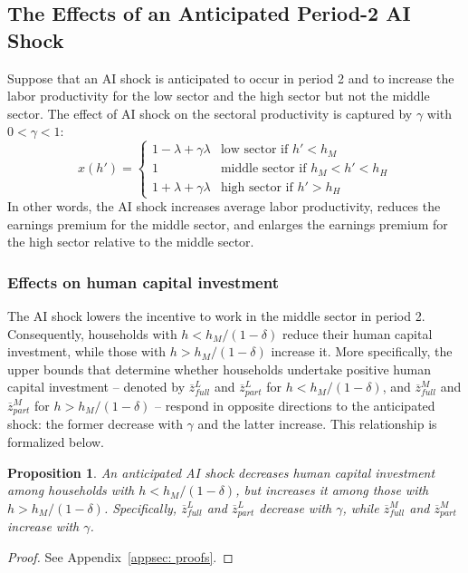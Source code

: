 \documentclass[12pt]{article}
\newtheorem{proposition}{Proposition}
\begin{document}
\subsection{The Effects of an Anticipated Period-2 AI Shock}
Suppose that an AI shock is anticipated to occur in period 2 and to increase the labor productivity for the low sector and the high sector but not the middle sector. The effect of AI shock on the sectoral productivity is captured by $\gamma$ with $0<\gamma<1$:
\begin{equation}
    \label{eq:xAI}
x(h')=\left \{ 
\begin{array}{cl}
1-\lambda + \gamma \lambda & \text{low sector if }h'<h_{M} \\ 
1 & \text{middle sector if }h_{M}<h'<h_{H} \\ 
1+\lambda + \gamma \lambda & \text{high sector if }h'>h_{H}%
\end{array}%
\right. 
\end{equation}
In other words, the AI shock increases average labor productivity, reduces the earnings premium for the middle sector, and enlarges the earnings premium for the high sector relative to the middle sector.


\subsubsection{Effects on human capital investment} 

The AI shock lowers the incentive to work in the middle sector in period 2. Consequently, households with $h < h_M/(1-\delta)$ reduce their human capital investment, while those with $h > h_M/(1-\delta)$ increase it. More specifically, the upper bounds that determine whether households undertake positive human capital investment -- denoted by $\overline{z}^L_{full}$ and $\overline{z}^L_{part}$ for $h < h_M/(1-\delta)$, and $\overline{z}^M_{full}$ and $\overline{z}^M_{part}$ for $h > h_M/(1-\delta)$ -- respond in opposite directions to the anticipated shock: the former decrease with $\gamma$ and the latter increase. This relationship is formalized below.

\begin{proposition}\label{prop:AI_human_capital}
An anticipated AI shock decreases human capital investment among households with $h < h_M/(1-\delta)$, but increases it among those with $h > h_M/(1-\delta)$. Specifically, $\overline{z}^L_{full}$ and $\overline{z}^L_{part}$ decrease with $\gamma$, while $\overline{z}^M_{full}$ and $\overline{z}^M_{part}$ increase with $\gamma$.
\end{proposition}
\begin{proof}
    See Appendix~\ref{appsec: proofs}.
\end{proof}
\end{document}
